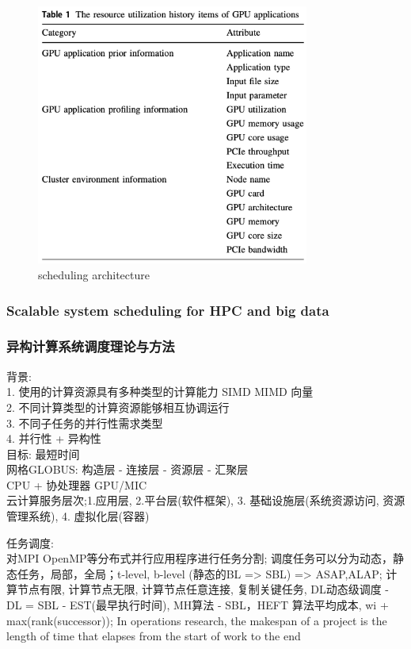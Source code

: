 \documentclass[UTF8]{article}
\begin{document}
\begin{figure}[htbp]
\caption{scheduling architecture}
\centering
\includegraphics[width=0.8\textwidth]{GPUAPP.png}
\end{figure}
\subsubsection{Scalable system scheduling for HPC and big data}
\subsubsection{异构计算系统调度理论与方法}
背景:\\
1. 使用的计算资源具有多种类型的计算能力 SIMD MIMD 向量 \\
2. 不同计算类型的计算资源能够相互协调运行 \\
3. 不同子任务的并行性需求类型 \\
4. 并行性 + 异构性 \\
目标: 最短时间\\
网格GLOBUS: 构造层 - 连接层 - 资源层 - 汇聚层\\
CPU + 协处理器 GPU/MIC \\
云计算服务层次;1.应用层, 2.平台层(软件框架), 3. 基础设施层(系统资源访问, 资源管理系统), 4. 虚拟化层(容器)

任务调度:\\对MPI OpenMP等分布式并行应用程序进行任务分割; 调度任务可以分为动态，静态任务，局部，全局；t-level, b-level (静态的BL => SBL)  => ASAP,ALAP; 计算节点有限, 计算节点无限, 计算节点任意连接, 复制关键任务, DL动态级调度 - DL = SBL - EST(最早执行时间), MH算法 - SBL，HEFT 算法平均成本, wi + max(rank(successor)); In operations research, the makespan of a project is the length of time that elapses from the start of work to the end
\end{document}
